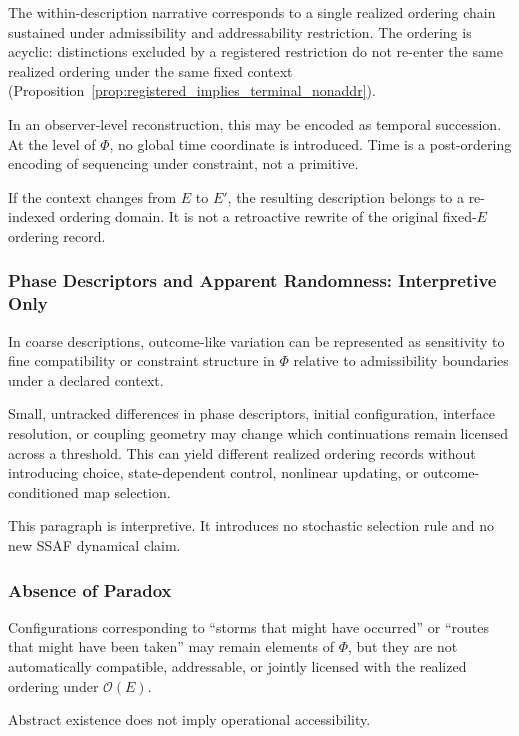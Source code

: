 \documentclass[aps,prx,onecolumn,11pt]{revtex4-2}
\theoremstyle{plain}
\theoremstyle{definition}
\theoremstyle{remark}
\begin{document}
The within-description narrative corresponds to a single realized
ordering chain sustained under admissibility and addressability
restriction. The ordering is acyclic: distinctions excluded by a
registered restriction do not re-enter the same realized ordering under
the same fixed context
(Proposition~\ref{prop:registered_implies_terminal_nonaddr}).

In an observer-level reconstruction, this may be encoded as temporal
succession. At the level of \(\Phi\), no global time coordinate is
introduced. Time is a post-ordering encoding of sequencing under
constraint, not a primitive.

If the context changes from \(E\) to \(E'\), the resulting description
belongs to a re-indexed ordering domain. It is not a retroactive rewrite
of the original fixed-\(E\) ordering record.

\subsubsection{Phase Descriptors and Apparent Randomness: Interpretive Only}

In coarse descriptions, outcome-like variation can be represented as
sensitivity to fine compatibility or constraint structure in \(\Phi\)
relative to admissibility boundaries under a declared context.

Small, untracked differences in phase descriptors, initial
configuration, interface resolution, or coupling geometry may change
which continuations remain licensed across a threshold. This can yield
different realized ordering records without introducing choice,
state-dependent control, nonlinear updating, or outcome-conditioned
map selection.

This paragraph is interpretive. It introduces no stochastic selection
rule and no new SSAF dynamical claim.

\subsubsection{Absence of Paradox}

Configurations corresponding to ``storms that might have occurred'' or
``routes that might have been taken'' may remain elements of \(\Phi\),
but they are not automatically compatible, addressable, or jointly
licensed with the realized ordering under \(\mathcal O(E)\).

Abstract existence does not imply operational accessibility.
\end{document}

